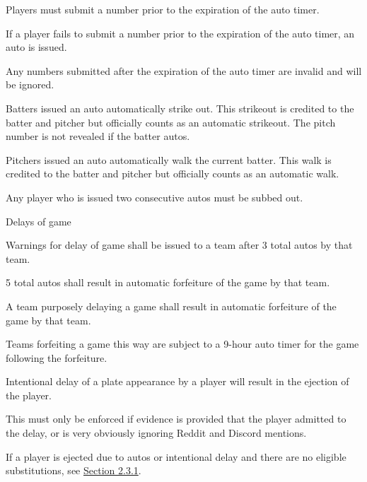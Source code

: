 \begin{deepEnumerate}
\begin{deepEnumerate}
		\item Players must submit a number prior to the expiration of the auto timer.
		\item If a player fails to submit a number prior to the expiration of the auto timer, an auto is issued.
		\begin{deepEnumerate}
			\item Any numbers submitted after the expiration of the auto timer are invalid and will be ignored.
			\item Batters issued an auto automatically strike out. This strikeout is credited to the batter and pitcher but officially counts as an automatic strikeout.
			The pitch number is not revealed if the batter autos.
			\item Pitchers issued an auto automatically walk the current batter. This walk is credited to the batter and pitcher but officially counts as an automatic walk.
		\end{deepEnumerate}
		\item Any player who is issued two consecutive autos must be subbed out.
		\item Delays of game
		\begin{deepEnumerate}
			\item Warnings for delay of game shall be issued to a team after 3 total autos by that team.
			\item 5 total autos shall result in automatic forfeiture of the game by that team.
			\item A team purposely delaying a game shall result in automatic forfeiture of the game by that team.
			\begin{deepEnumerate}
				\item Teams forfeiting a game this way are subject to a 9-hour auto timer for the game following the forfeiture.
			\end{deepEnumerate}
			\item Intentional delay of a plate appearance by a player will result in the ejection of the player.
			\begin{deepEnumerate}
				\item This must only be enforced if evidence is provided that the player admitted to the delay, or is very obviously ignoring Reddit and Discord mentions.
			\end{deepEnumerate}
		\end{deepEnumerate}
		\item If a player is ejected due to autos or intentional delay and there are no eligible substitutions, see \hyperref[sec:lineups]{Section 2.3.1}.

\end{deepEnumerate}
\end{deepEnumerate}
